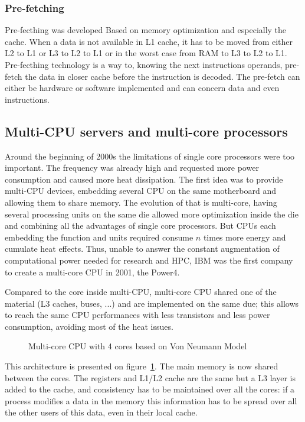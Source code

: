 \subsubsection{Pre-fetching} 
Pre-fecthing was developed Based on memory optimization and especially the cache.
When a data is not available in L1 cache, it has to be moved from either L2 to L1 or L3 to L2 to L1 or in the worst case from RAM to L3 to L2 to L1. 
Pre-fecthing technology is a way to, knowing the next instructions operands, pre-fetch the data in closer cache before the instruction is decoded. 
The pre-fetch can either be hardware or software implemented and can concern data and even instructions.



\subsection{Multi-CPU servers and multi-core processors}
Around the beginning of 2000s the limitations of single core processors were too important. 
The frequency was already high and requested more power consumption and caused more heat dissipation. 
The first idea was to provide multi-CPU devices, embedding several CPU on the same motherboard and allowing them to share memory. 
The evolution of that is multi-core, having several processing units on the same die allowed more optimization inside the die and combining all the advantages of single core processors.
But CPUs each embedding the function and units required consume $n$ times more energy and cumulate heat effects.
Thus, unable to answer the constant augmentation of computational power needed for research and HPC, IBM was the first company to create a multi-core CPU in 2001, the Power4. 

Compared to the core inside multi-CPU, multi-core CPU shared one of the material (L3 caches, buses, ...) and are implemented on the same due; this allows to reach the same CPU performances with less transistors and less power consumption, avoiding most of the heat issues. 

\begin{figure}
\centering 

\caption{Multi-core CPU with 4 cores based on Von Neumann Model}
\label{fig:2_HARD:von_neumann_model_multi-core}
\end{figure}

This architecture is presented on figure~\ref{fig:2_HARD:von_neumann_model_multi-core}.
The main memory is now shared between the cores. 
The registers and L1/L2 cache are the same but a L3 layer is added to the cache, and consistency has to be maintained over all the cores: if a process modifies a data in the memory this information has to be spread over all the other users of this data, even in their local cache. 

